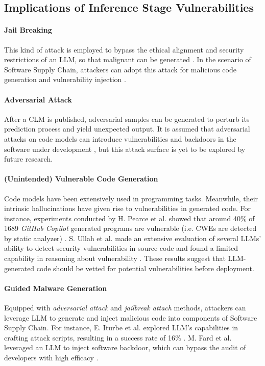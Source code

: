 \subsection{Implications of Inference Stage Vulnerabilities}
\label{subsec:impinfer}

\paragraph*{Jail Breaking} This kind of attack is employed to bypass the ethical
alignment\citep{carlini23aligned} and security restrictions of an LLM, so that malignant 
can be generated \citep{10.1145/3716628}. In the scenario of Software Supply Chain, attackers
can adopt this attack for malicious code generation and
vulnerability injection \citep{10.1007/s10515-026-00628-7}.

\paragraph*{Adversarial Attack}  After a CLM is published,
 adversarial samples  can be generated to perturb its prediction
process and yield unexpected output. It is assumed that 
adversarial attacks on code models can introduce vulnerabilities and
backdoors in the software under development \citep{10.1007/s10515-024-00464-7},
but this attack surface is yet to be explored by future research.

\paragraph*{(Unintended) Vulnerable Code Generation}
Code models have been extensively used in programming tasks.
Meanwhile, their intrinsic hallucinations have given rise to vulnerabilities
in generated code. For instance, experiments conducted by H. Pearce et al. 
showed that around 40\% of 1689 \textit{GitHub Copilot} \citep{copilot}
generated programs are vulnerable (i.e. 
CWEs are detected by static analyzer) \citep{copilotsecurity}.
S. Ullah et al. made an extensive evaluation of several LLMs' ability
to detect security vulnerabilities in source code and found a limited
capability in reasoning about  vulnerability \citep{ullah2024llms}.
These results suggest that LLM-generated code should be vetted
for potential vulnerabilities before deployment.

\paragraph*{Guided Malware Generation}
Equipped with \textit{adversarial attack} and \textit{jailbreak attach}
methods, attackers can leverage LLM to generate and inject malicious
code into components of Software Supply Chain. For instance,
E. Iturbe et al. explored LLM's capabilities in crafting attack scripts,
resulting in a success rate of 16\% \citep{ITURBE2024104077}.
M. Fard et al. leveraged an LLM to inject software backdoor,
which can bypass the audit of developers with high efficacy \citep{llmbackdoordet}.


